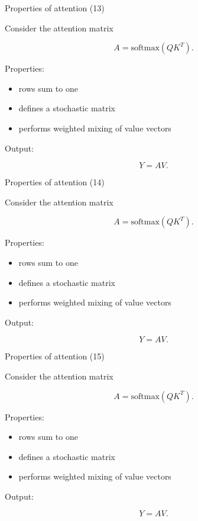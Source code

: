 \documentclass[aspectratio=169]{beamer}
\begin{document}
\begin{frame}{Properties of attention (13)}

Consider the attention matrix

\[
A = \text{softmax}(QK^T).
\]

Properties:

\begin{itemize}
\item rows sum to one
\item defines a stochastic matrix
\item performs weighted mixing of value vectors
\end{itemize}

Output:

\[
Y = AV.
\]

\end{frame}


\begin{frame}{Properties of attention (14)}

Consider the attention matrix

\[
A = \text{softmax}(QK^T).
\]

Properties:

\begin{itemize}
\item rows sum to one
\item defines a stochastic matrix
\item performs weighted mixing of value vectors
\end{itemize}

Output:

\[
Y = AV.
\]

\end{frame}


\begin{frame}{Properties of attention (15)}

Consider the attention matrix

\[
A = \text{softmax}(QK^T).
\]

Properties:

\begin{itemize}
\item rows sum to one
\item defines a stochastic matrix
\item performs weighted mixing of value vectors
\end{itemize}

Output:

\[
Y = AV.
\]

\end{frame}
\end{document}
